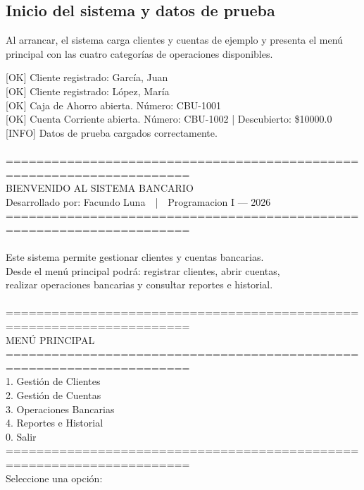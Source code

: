 \documentclass[12pt, a4paper]{article}
\begin{document}
\subsection{Inicio del sistema y datos de prueba}

Al arrancar, el sistema carga clientes y cuentas de ejemplo y presenta
el menú principal con las cuatro categorías de operaciones disponibles.

\begin{tcolorbox}[
  enhanced, breakable,
  colback=black!92!white,
  colframe=black!60!white,
  coltext=green!70!white,
  boxrule=0.5pt,
  arc=4pt,
  fontupper=\ttfamily\small
]
{[OK]} Cliente registrado: García, Juan\\
{[OK]} Cliente registrado: López, María\\
{[OK]} Caja de Ahorro abierta. Número: CBU-1001\\
{[OK]} Cuenta Corriente abierta. Número: CBU-1002 | Descubierto: \$10000.0\\
{[INFO]} Datos de prueba cargados correctamente.\\
~\\
======================================================================\\
BIENVENIDO AL SISTEMA BANCARIO\\
Desarrollado por: Facundo Luna~~|~~Programacion I --- 2026\\
======================================================================\\
~\\
Este sistema permite gestionar clientes y cuentas bancarias.\\
Desde el menú principal podrá: registrar clientes, abrir cuentas,\\
realizar operaciones bancarias y consultar reportes e historial.\\
~\\
======================================================================\\
MENÚ PRINCIPAL\\
======================================================================\\
1. Gestión de Clientes\\
2. Gestión de Cuentas\\
3. Operaciones Bancarias\\
4. Reportes e Historial\\
0. Salir\\
======================================================================\\
Seleccione una opción:
\end{tcolorbox}
\end{document}
